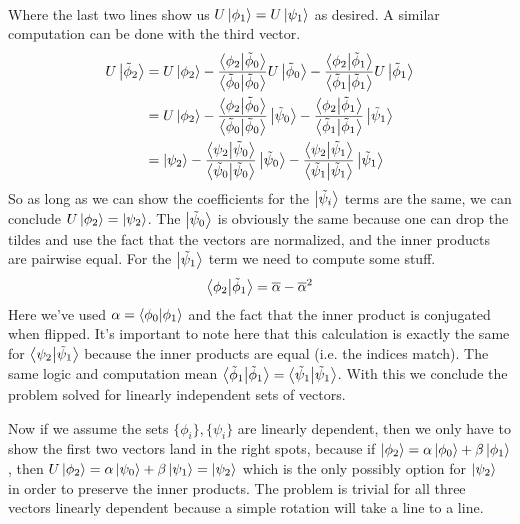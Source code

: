 \documentclass[boxes,pages]{homework}
\begin{document}
\begin{solution}
\begin{align*}
	\end{align*}
	Where the last two lines show us $U\ket{\phi_1} = U\ket{\psi_1}$ as desired. A similar computation can be done with the third vector.
	\begin{align*}
		U\ket{\tilde{\phi}_2} & = U\ket{\phi_2} - \frac{\braket{\phi_2}{\tilde{\phi}_0}}{\braket{\tilde{\phi}_0}{\tilde{\phi}_0}}U\ket{\tilde{\phi}_0} - \frac{\braket{\phi_2}{\tilde{\phi}_1}}{\braket{\tilde{\phi}_1}{\tilde{\phi}_1}}U\ket{\tilde{\phi}_1} \\
		                      & = U\ket{\phi_2} - \frac{\braket{\phi_2}{\tilde{\phi}_0}}{\braket{\tilde{\phi}_0}{\tilde{\phi}_0}}\ket{\tilde{\psi}_0} - \frac{\braket{\phi_2}{\tilde{\phi}_1}}{\braket{\tilde{\phi}_1}{\tilde{\phi}_1}}\ket{\tilde{\psi}_1}   \\
		                      & = \ket{\psi_2} - \frac{\braket{\psi_2}{\tilde{\psi}_0}}{\braket{\tilde{\psi}_0}{\tilde{\psi}_0}}\ket{\tilde{\psi}_0} - \frac{\braket{\psi_2}{\tilde{\psi}_1}}{\braket{\tilde{\psi}_1}{\tilde{\psi}_1}}\ket{\tilde{\psi}_1}
	\end{align*}
	So as long as we can show the coefficients for the $\ket{\tilde{\psi}_i}$ terms are the same, we can conclude $U\ket{\phi_2} = \ket{\psi_2}$. The $\ket{\tilde{\psi}_0}$ is obviously the same because one can drop the tildes and use the fact that the vectors are normalized, and the inner products are pairwise equal. For the $\ket{\tilde{\psi}_1}$ term we need to compute some stuff.
	\begin{equation*}
		\braket{\phi_2}{\tilde{\phi}_1} = \overline{\alpha} - \overline{\alpha}^2
	\end{equation*}
	Here we've used $\alpha = \braket{\phi_0}{\phi_1}$ and the fact that the inner product is conjugated when flipped. It's important to note here that this calculation is exactly the same for $\braket{\psi_2}{\tilde{\psi}_1}$ because the inner products are equal (i.e. the indices match). The same logic and computation mean $\braket{\tilde{\phi}_1}{\tilde{\phi}_1} = \braket{\tilde{\psi}_1}{\tilde{\psi}_1}$. With this we conclude the problem solved for linearly independent sets of vectors.

	Now if we assume the sets $\{\phi_i\}, \{\psi_i\}$ are linearly dependent, then we only have to show the first two vectors land in the right spots, because if $\ket{\phi_2} = \alpha\ket{\phi_0} + \beta\ket{\phi_1}$, then $U\ket{\phi_2} = \alpha\ket{\psi_0} + \beta\ket{\psi_1} = \ket{\psi_2}$ which is the only possibly option for $\ket{\psi_2}$ in order to preserve the inner products. The problem is trivial for all three vectors linearly dependent because a simple rotation will take a line to a line.
\end{solution}
\end{document}
